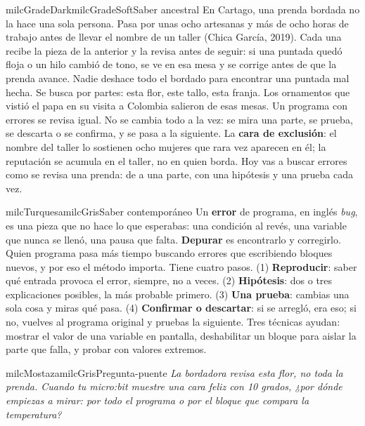 \documentclass[11pt,letterpaper]{article}
\begin{document}
\begin{softbox}{milcGradeDark}{milcGradeSoft}{Saber ancestral}
En Cartago, una prenda bordada no la hace una sola persona. Pasa por unas ocho artesanas y más de ocho horas de trabajo antes de llevar el nombre de un taller (Chica García, 2019). Cada una recibe la pieza de la anterior y la revisa antes de seguir: si una puntada quedó floja o un hilo cambió de tono, se ve en esa mesa y se corrige antes de que la prenda avance. Nadie deshace todo el bordado para encontrar una puntada mal hecha. Se busca por partes: esta flor, este tallo, esta franja. Los ornamentos que vistió el papa en su visita a Colombia salieron de esas mesas. Un programa con errores se revisa igual. No se cambia todo a la vez: se mira una parte, se prueba, se descarta o se confirma, y se pasa a la siguiente. La \textbf{cara de exclusión}: el nombre del taller lo sostienen ocho mujeres que rara vez aparecen en él; la reputación se acumula en el taller, no en quien borda. Hoy vas a buscar errores como se revisa una prenda: de a una parte, con una hipótesis y una prueba cada vez.\par{}
\end{softbox}

\begin{softbox}{milcTurquesa}{milcGris}{Saber contemporáneo}
Un \textbf{error} de programa, en inglés \textit{bug}, es una pieza que no hace lo que esperabas: una condición al revés, una variable que nunca se llenó, una pausa que falta. \textbf{Depurar} es encontrarlo y corregirlo. Quien programa pasa más tiempo buscando errores que escribiendo bloques nuevos, y por eso el método importa. Tiene cuatro pasos. (1) \textbf{Reproducir}: saber qué entrada provoca el error, siempre, no a veces. (2) \textbf{Hipótesis}: dos o tres explicaciones posibles, la más probable primero. (3) \textbf{Una prueba}: cambias una sola cosa y miras qué pasa. (4) \textbf{Confirmar o descartar}: si se arregló, era eso; si no, vuelves al programa original y pruebas la siguiente. Tres técnicas ayudan: mostrar el valor de una variable en pantalla, deshabilitar un bloque para aislar la parte que falla, y probar con valores extremos.
\end{softbox}

\begin{softbox}{milcMostaza}{milcGris}{Pregunta-puente}
\textit{La bordadora revisa esta flor, no toda la prenda. Cuando tu micro:bit muestre una cara feliz con 10 grados, ¿por dónde empiezas a mirar: por todo el programa o por el bloque que compara la temperatura?}
\end{softbox}
\end{document}
